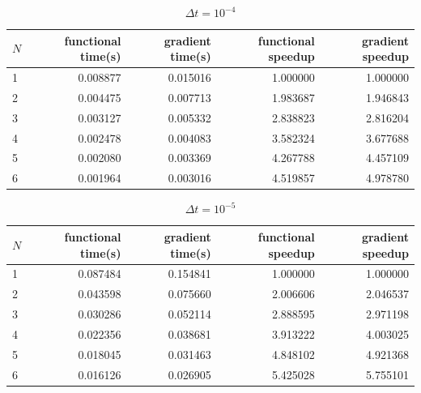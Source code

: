 \begin{table}[!h]
\centering
\caption{$\Delta t=10^{-4}$}
\begin{tabular}{lrrrr}
\toprule
{} $N$&  functional time(s) &  gradient time(s) &  functional speedup &  gradient speedup \\
\midrule
1 &           0.008877 &          0.015016 &            1.000000 &          1.000000 \\
2 &           0.004475 &          0.007713 &            1.983687 &          1.946843 \\
3 &           0.003127 &          0.005332 &            2.838823 &          2.816204 \\
4 &           0.002478 &          0.004083 &            3.582324 &          3.677688 \\
5 &           0.002080 &          0.003369 &            4.267788 &          4.457109 \\
6 &           0.001964 &          0.003016 &            4.519857 &          4.978780 \\
\bottomrule
\end{tabular}
\end{table}
\begin{table}[!h]
\centering
\caption{$\Delta t=10^{-5}$}
\begin{tabular}{lrrrr}
\toprule
{} $N$&  functional time(s) &  gradient time(s) &  functional speedup &  gradient speedup \\
\midrule
1 &           0.087484 &          0.154841 &            1.000000 &          1.000000 \\
2 &           0.043598 &          0.075660 &            2.006606 &          2.046537 \\
3 &           0.030286 &          0.052114 &            2.888595 &          2.971198 \\
4 &           0.022356 &          0.038681 &            3.913222 &          4.003025 \\
5 &           0.018045 &          0.031463 &            4.848102 &          4.921368 \\
6 &           0.016126 &          0.026905 &            5.425028 &          5.755101 \\
\bottomrule
\end{tabular}
\end{table}
